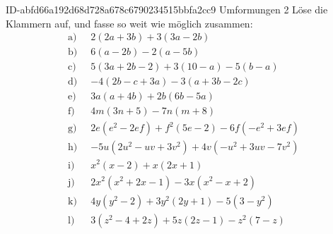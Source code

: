 \begin{exercise}
      {ID-abfd66a192d68d728a678c6790234515bbfa2cc9}
      {Umformungen 2}
  \ifproblem\problem
    \newcommand{\gap}{\;\;}%
    Löse die Klammern auf, und fasse so weit wie möglich zusammen:
    \begin{equation*}
      \begin{split}
        \text{a)}\gap & 2(2a+3b)+3(3a-2b) \\
        \text{b)}\gap & 6(a-2b)-2(a-5b) \\
        \text{c)}\gap & 5(3a+2b-2)+3(10-a)-5(b-a) \\
        \text{d)}\gap & -4(2b-c+3a)-3(a+3b-2c) \\
        \text{e)}\gap & 3a(a+4b)+2b(6b-5a) \\
        \text{f)}\gap & 4m(3n+5)-7n(m+8) \\
        \text{g)}\gap & 2e(e^2-2ef)+f^2(5e-2)-6f(-e^2+3ef) \\
        \text{h)}\gap & -5u(2u^2-uv+3v^2)+4v(-u^2+3uv-7v^2) \\
        \text{i)}\gap & x^2(x-2)+x(2x+1) \\
        \text{j)}\gap & 2x^2(x^2+2x-1)-3x(x^2-x+2) \\
        \text{k)}\gap & 4y(y^2-2)+3y^2(2y+1)-5(3-y^2) \\
        \text{l)}\gap & 3(z^2-4+2z)+5z(2z-1)-z^2(7-z)
      \end{split}
    \end{equation*}
  \fi
  \ifoutcome\outcome
    \newcommand{\toprow}[2][20em]
    {%
      \makebox[#1][l]
      {%
        \ensuremath
        {%
          \displaystyle
          \phantom{\,=\:\,}%
          #2%
        }%
      }%
    }%
    \newcommand{\solutionA}[1]
    {%
      \begin{equation*}
        \begin{split}
          \text{a)} &\toprow[#1]{2(2a+3b)+3(3a-2b)} \\
                    &=           4a+6b+9a-6b        \\
                    &=           4a+9a+6b-6b        \\
                    &=           13a
        \end{split}
      \end{equation*}
    }%
    \newcommand{\solutionB}[1]
    {%
      \begin{equation*}

\end{equation*}}
\end{exercise}
